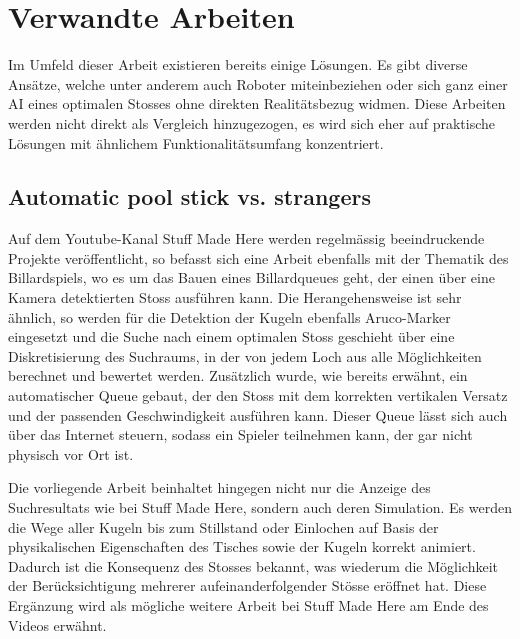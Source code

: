 \section{Verwandte Arbeiten}\label{kap:verwandte_arbeiten}
Im Umfeld dieser Arbeit existieren bereits einige Lösungen. Es gibt diverse Ansätze, welche
unter anderem auch Roboter miteinbeziehen\cite{qucosa:ein_billardroboter:1} oder sich ganz einer AI eines
optimalen Stosses ohne direkten Realitätsbezug widmen\cite{inproceedings:billiard_ai:1}. Diese Arbeiten werden nicht
direkt als Vergleich hinzugezogen, es wird sich eher auf praktische Lösungen mit ähnlichem Funktionalitätsumfang
konzentriert.

\subsection{Automatic pool stick vs. strangers}
Auf dem Youtube-Kanal \glqq Stuff Made Here\grqq{} werden regelmässig beeindruckende Projekte veröffentlicht, so befasst
sich eine Arbeit ebenfalls mit der Thematik des Billardspiels, wo es um das Bauen eines Billardqueues geht, der einen
über eine Kamera detektierten Stoss ausführen kann\cite{stuffmadehere:automaticpoolstick}. Die Herangehensweise ist
sehr ähnlich, so werden für die Detektion der Kugeln ebenfalls Aruco-Marker eingesetzt und die Suche nach einem optimalen
Stoss geschieht über eine Diskretisierung des Suchraums, in der von jedem Loch aus alle Möglichkeiten berechnet und
bewertet werden. Zusätzlich wurde, wie bereits erwähnt, ein automatischer Queue gebaut, der den Stoss mit dem korrekten
vertikalen Versatz und der passenden Geschwindigkeit ausführen kann. Dieser Queue lässt sich auch über das Internet
steuern, sodass ein Spieler teilnehmen kann, der gar nicht physisch vor Ort ist.

Die vorliegende Arbeit beinhaltet hingegen nicht nur die Anzeige des Suchresultats wie bei \glqq Stuff Made Here\grqq{},
sondern auch deren Simulation. Es werden die Wege aller Kugeln bis zum
Stillstand oder Einlochen auf Basis der physikalischen Eigenschaften des Tisches sowie der Kugeln korrekt animiert.
Dadurch ist die Konsequenz des Stosses bekannt, was wiederum die Möglichkeit der Berücksichtigung
mehrerer aufeinanderfolgender Stösse eröffnet hat.
Diese Ergänzung wird als mögliche weitere Arbeit bei \glqq Stuff Made Here\grqq{} am Ende des Videos erwähnt.

